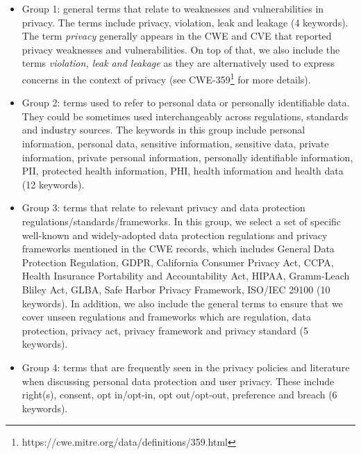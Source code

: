 \begin{itemize}[leftmargin=*]
    \item Group 1: general terms that relate to weaknesses and vulnerabilities in privacy. The terms include privacy, violation, leak and leakage (4 keywords). The term \emph{privacy} generally appears in the CWE and CVE that reported privacy weaknesses and vulnerabilities. On top of that, we also include the terms \emph{violation, leak and leakage} as they are alternatively used to express concerns in the context of privacy (see CWE-359\footnote{https://cwe.mitre.org/data/definitions/359.html} for more details).

    \item Group 2: terms used to refer to personal data or personally identifiable data. They could be sometimes used interchangeably across regulations, standards and industry sources. The keywords in this group include personal information, personal data, sensitive information, sensitive data, private information, private personal information, personally identifiable information, PII, protected health information, PHI, health information and health data (12 keywords). %

    \item Group 3: terms that relate to relevant privacy and data protection regulations/standards/frameworks. In this group, we select a set of specific well-known and widely-adopted data protection regulations and privacy frameworks mentioned in the CWE records, which includes General Data Protection Regulation, GDPR, California Consumer Privacy Act, CCPA, Health Insurance Portability and Accountability Act, HIPAA, Gramm-Leach Bliley Act, GLBA, Safe Harbor Privacy Framework, ISO/IEC 29100 (10 keywords). In addition, we also include the general terms to ensure that we cover unseen regulations and frameworks which are regulation, data protection, privacy act, privacy framework and privacy standard (5 keywords).

    \item Group 4: terms that are frequently seen in the privacy policies and literature when discussing personal data protection and user privacy. These include right(s), consent, opt in/opt-in, opt out/opt-out, preference and breach (6 keywords).
\end{itemize}

%

